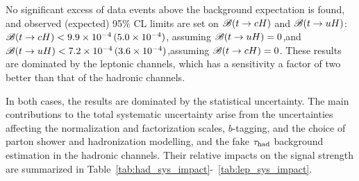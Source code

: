 No significant excess of data events above the background expectation is found,
and observed (expected) 95\% CL limits are set on $\mathscr{B}(t\to cH)$ and $\mathscr{B}(t\to uH)$:
$\mathscr{B}(t\to cH)<9.9 \times 10^{-4}\,(5.0 \times 10^{-4})$, assuming $\mathscr{B}(t\to uH)=0$,and $\mathscr{B}(t\to uH)<7.2 \times 10^{-4}\,(3.6 \times 10^{-4})$,assuming $\mathscr{B}(t\to cH)=0$.
These results are dominated by the leptonic channels, which has a sensitivity a factor of two better than that of the hadronic channels.


In both cases, the results are dominated by the statistical uncertainty.
The main contributions to the total systematic uncertainty arise from the uncertainties affecting the normalization and factorization scales, $b$-tagging, and the choice of parton shower and hadronization modelling, and the fake $\tau_{\mathrm{had}}$ background estimation in the hadronic channels. Their relative impacts on the signal strength are summarized in Table~\ref{tab:had_sys_impact}-~\ref{tab:lep_sys_impact}. 

